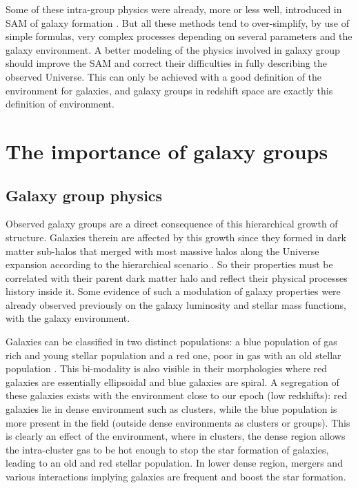 Some of these intra-group physics were already, more or less well, introduced
in SAM of galaxy formation \citep{Okamoto+03,Lanzoni+05,Font+08,Guo+11}. But
all these methods tend to over-simplify, by use of simple formulas, very
complex processes depending on several parameters and the galaxy environment. A
better modeling of the physics involved in galaxy group should improve the SAM
and correct their difficulties in fully describing the observed Universe. This
can only be achieved with a good definition of the environment for galaxies,
and galaxy groups in redshift space are exactly this definition of environment.

\section{The importance of galaxy groups}
\label{sec:the_importance_of_galaxy_groups}

\subsection{Galaxy group physics}
\label{sub:galaxy_group_physics}

Observed galaxy groups are a direct consequence of this hierarchical growth of
structure. Galaxies therein are affected by this growth since they formed in
dark matter sub-halos that merged with most massive halos along the Universe
expansion according to the hierarchical scenario \citep{Lacey+93}. So their
properties must be correlated with their parent dark matter halo and reflect
their physical processes history inside it. Some evidence of such a modulation
of galaxy properties were already observed previously on the galaxy luminosity
\citep{Robotham+10} and stellar mass \citep{Yang+09} functions, with the galaxy
environment.

Galaxies can be classified in two distinct populations: a blue population of
gas rich and young stellar population and a red one, poor in gas with an old
stellar population \citep{Driver+06}. This bi-modality is also visible in their
morphologies where red galaxies are essentially ellipsoidal and blue galaxies
are spiral. A segregation of these galaxies exists with the environment close
to our epoch (low redshifts): red galaxies lie in dense environment such as
clusters, while the blue population is more present in the field (outside dense
environments as clusters or groups). This is clearly an effect of the
environment, where in clusters, the dense region allows the intra-cluster gas
to be hot enough to stop the star formation of galaxies, leading to an old and
red stellar population. In lower dense region, mergers and various interactions
implying galaxies are frequent and boost the star formation.


